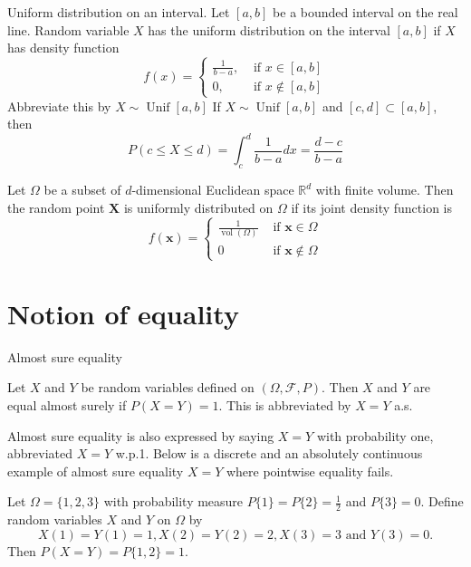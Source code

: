 \documentclass[11pt]{elegantbook}
\begin{document}
\begin{definition}{Uniform distribution on an interval.}
Let $[a, b]$ be a bounded interval on the real line. Random variable $X$ has the uniform distribution on the interval $[a, b]$ if $X$ has density function
$$
f(x)= \begin{cases}\frac{1}{b-a}, & \text { if } x \in[a, b] \\ 0, & \text { if } x \notin[a, b]\end{cases}
$$
Abbreviate this by $X \sim \operatorname{Unif}[a, b]$
If $X \sim \operatorname{Unif}[a, b]$ and $[c, d] \subset[a, b]$, then
$$
P(c \leq X \leq d)=\int_c^d \frac{1}{b-a} d x=\frac{d-c}{b-a}
$$
\end{definition}

\begin{definition}
 Let $\Omega$ be a subset of $d$-dimensional Euclidean space $\mathbb{R}^d$ with finite volume. Then the random point $\mathbf{X}$ is uniformly distributed on $\Omega$ if its joint density function is
$$
f(\mathbf{x})= \begin{cases}\frac{1}{\operatorname{vol}(\Omega)} & \text { if } \mathbf{x} \in \Omega \\ 0 & \text { if } \mathbf{x} \notin \Omega\end{cases}
$$
\end{definition}

\section{Notion of equality}

\begin{definition}{ Almost sure equality}
   
Let $X$ and $Y$ be random variables defined on $(\Omega, \mathcal{F}, P)$. Then $X$ and $Y$ are equal almost surely if $P(X=Y)=1$. This is abbreviated by $X=Y$ a.s.


\end{definition}

\begin{note}
    Almost sure equality is also expressed by saying $X=Y$ with probability one, abbreviated $X=Y$ w.p.1. Below is a discrete and an absolutely continuous example of almost sure equality $X=Y$ where pointwise equality fails.
\end{note}
\begin{example}
    Let $\Omega=\{1,2,3\}$ with probability measure $P\{1\}=P\{2\}=\frac{1}{2}$ and $P\{3\}=0$. Define random variables $X$ and $Y$ on $\Omega$ by
$$
X(1)=Y(1)=1, X(2)=Y(2)=2, X(3)=3 \text { and } Y(3)=0 .
$$
Then $P(X=Y)=P\{1,2\}=1$.
\end{example}
\end{document}
